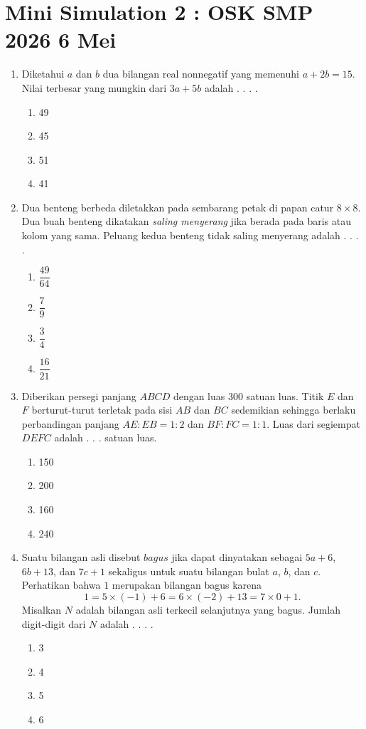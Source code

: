 \documentclass[12pt]{scrartcl}
\begin{document}
\renewcommand*\contentsname{Daftar Isi}
\tableofcontents

\newpage

\section*{Mini Simulation 2 : OSK SMP 2026 6 Mei}
\begin{enumerate}
    \item Diketahui $a$ dan $b$ dua bilangan real nonnegatif yang memenuhi $a+2b=15$. Nilai terbesar yang mungkin dari $3a+5b$ adalah . . . .
    \begin{enumerate}[label={(\Alph*)}]
        \item 49 \item 45 \item 51 \item 41
    \end{enumerate}

    \item Dua benteng berbeda diletakkan pada sembarang petak di papan catur $8\times 8$. Dua buah benteng dikatakan \textit{saling menyerang} jika berada pada baris atau kolom yang sama. Peluang kedua benteng tidak saling menyerang adalah . . . .
    \begin{enumerate}[label={(\Alph*)}]
        \item $\dfrac{49}{64}$ \item $\dfrac{7}{9}$ \item $\dfrac{3}{4}$ \item $\dfrac{16}{21}$
    \end{enumerate}

    \item Diberikan persegi panjang $ABCD$ dengan luas $300$ satuan luas. Titik $E$ dan $F$ berturut-turut terletak pada sisi $AB$ dan $BC$ sedemikian sehingga berlaku perbandingan panjang $AE:EB=1:2$ dan $BF:FC=1:1$. Luas dari segiempat $DEFC$ adalah . . . satuan luas.
    \begin{enumerate}[label={(\Alph*)}]
        \item 150 \item 200 \item 160 \item 240
    \end{enumerate}

    \item Suatu bilangan asli disebut $bagus$ jika dapat dinyatakan sebagai $5a+6$, $6b+13$, dan $7c+1$ sekaligus untuk suatu bilangan bulat $a$, $b$, dan $c$. Perhatikan bahwa $1$ merupakan bilangan bagus karena
    $$1 = 5\times (-1)+6 = 6\times (-2) +13 = 7\times 0+1.$$
    Misalkan $N$ adalah bilangan asli terkecil selanjutnya yang bagus. Jumlah digit-digit dari $N$ adalah . . . .
    \begin{enumerate}[label={(\Alph*)}]
        \item 3 \item 4 \item 5 \item 6
    \end{enumerate}


\end{enumerate}
\end{document}
